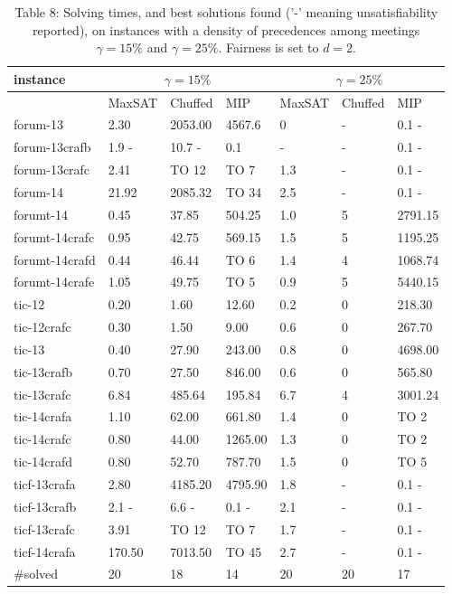 \documentclass[10pt]{article}
\begin{document}
\begin{table}[h]
\begin{center}
\captionsetup{labelformat=empty}
\caption{Table 8: Solving times, and best solutions found ('-' meaning unsatisfiability reported), on instances with a density of precedences among meetings $\gamma=15 \%$ and $\gamma=25 \%$. Fairness is set to $d=2$.}
\begin{tabular}{|l|l|l|l|l|l|l|}
\hline
\multirow{2}{*}{instance} & \multicolumn{3}{|c|}{$\gamma=15 \%$} & \multicolumn{3}{|c|}{$\gamma=25 \%$} \\
\hline
 & MaxSAT & Chuffed & MIP & MaxSAT & Chuffed & MIP \\
\hline
forum-13 & 2.30 & 2053.00 & 4567.6 & 0 & - & 0.1 - \\
\hline
forum-13crafb & 1.9 - & 10.7 - & 0.1 & - & - & 0.1 - \\
\hline
forum-13crafc & 2.41 & TO 12 & TO 7 & 1.3 & - & 0.1 - \\
\hline
forum-14 & 21.92 & 2085.32 & TO 34 & 2.5 & - & 0.1 - \\
\hline
forumt-14 & 0.45 & 37.85 & 504.25 & 1.0 & 5 & 2791.15 \\
\hline
forumt-14crafc & 0.95 & 42.75 & 569.15 & 1.5 & 5 & 1195.25 \\
\hline
forumt-14crafd & 0.44 & 46.44 & TO 6 & 1.4 & 4 & 1068.74 \\
\hline
forumt-14crafe & 1.05 & 49.75 & TO 5 & 0.9 & 5 & 5440.15 \\
\hline
tic-12 & 0.20 & 1.60 & 12.60 & 0.2 & 0 & 218.30 \\
\hline
tic-12crafc & 0.30 & 1.50 & 9.00 & 0.6 & 0 & 267.70 \\
\hline
tic-13 & 0.40 & 27.90 & 243.00 & 0.8 & 0 & 4698.00 \\
\hline
tic-13crafb & 0.70 & 27.50 & 846.00 & 0.6 & 0 & 565.80 \\
\hline
tic-13crafc & 6.84 & 485.64 & 195.84 & 6.7 & 4 & 3001.24 \\
\hline
tic-14crafa & 1.10 & 62.00 & 661.80 & 1.4 & 0 & TO 2 \\
\hline
tic-14crafc & 0.80 & 44.00 & 1265.00 & 1.3 & 0 & TO 2 \\
\hline
tic-14crafd & 0.80 & 52.70 & 787.70 & 1.5 & 0 & TO 5 \\
\hline
ticf-13crafa & 2.80 & 4185.20 & 4795.90 & 1.8 & - & 0.1 - \\
\hline
ticf-13crafb & 2.1 - & 6.6 - & 0.1 - & 2.1 & - & 0.1 - \\
\hline
ticf-13crafc & 3.91 & TO 12 & TO 7 & 1.7 & - & 0.1 - \\
\hline
ticf-14crafa & 170.50 & 7013.50 & TO 45 & 2.7 & - & 0.1 - \\
\hline
\#solved & 20 & 18 & 14 & 20 & 20 & 17 \\
\hline
\end{tabular}
\end{center}
\end{table}
\end{document}

